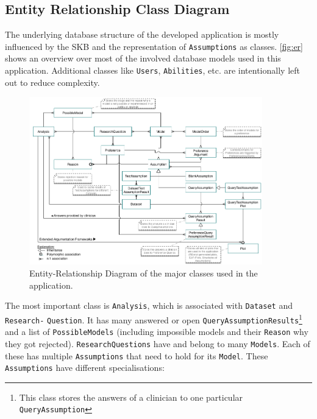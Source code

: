 \subsection{Entity Relationship Class Diagram }
\label{sub:db}


The underlying database structure of the developed application is mostly influenced by the \gls{SKB} and the representation of \texttt{Assumptions} as classes. \autoref{fig:er} shows an overview over most of the involved database models used in this application. Additional classes like \texttt{Users}, \texttt{Abilities}, etc. are intentionally left out to reduce complexity. 

\begin{figure}
	\centering
	\includegraphics[width=0.9\textwidth]{figures/er_complete}
	\caption{Entity-Relationship Diagram of the major classes used in the application. }
	\label{fig:er}
\end{figure}


The most important class is \texttt{Analysis}, which is associated with \texttt{Dataset} and \texttt{Research-} \texttt{Question}. It has many answered or open \texttt{QueryAssumptionResults}\footnote{This class stores the answers of a clinician to one particular \texttt{QueryAssumption}} and a list of \texttt{PossibleModels} (including impossible models and their \texttt{Reason} why they got rejected). \texttt{ResearchQuestions} have and belong to many \texttt{Models}. Each of these has multiple \texttt{Assumptions} that need to hold for its \texttt{Model}. These \texttt{Assumptions} have different specialisations: 

\bigskip

